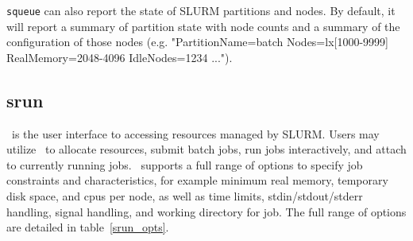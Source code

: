 {\tt squeue} can also report the state of SLURM partitions and nodes.  By
default, it will report a summary of partition state with node counts and
a summary of the configuration of those nodes (e.g.  "PartitionName=batch
Nodes=lx[1000-9999] RealMemory=2048-4096 IdleNodes=1234 ...").

\subsection{srun}

\srun\ is the user interface to accessing resources managed by SLURM.
Users may utilize \srun\ to allocate resources, submit batch jobs, 
run jobs interactively, and attach to currently running jobs. \srun\ 
supports a full range of options to specify job constraints and
characteristics, for example minimum real memory, temporary disk space,
and cpus per node, as well as time limits, stdin/stdout/stderr 
handling, signal handling, and working directory for job.
The full range of options are detailed in table~\ref{srun_opts}.

